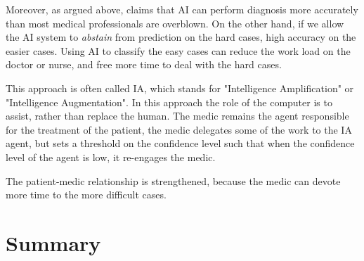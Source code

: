 \documentclass[10pt]{wlscirep}
\begin{document}
Moreover, as argued above, claims that AI can perform diagnosis more accurately than most medical professionals are overblown. On the other hand, if we allow the AI system to {\em abstain} from prediction on the hard cases, high accuracy on the easier cases. Using AI to classify the easy cases can reduce the work load on the doctor or nurse, and free more time to deal with the hard cases.

This approach is often called IA, which stands for "Intelligence Amplification" or "Intelligence Augmentation". In this approach the role of the computer is to assist, rather than replace the human.  The medic remains the agent responsible for the treatment of the patient, the medic delegates some of the work to the IA agent, but sets a threshold on the confidence level such that when the confidence level of the agent is low, it re-engages the medic.

The patient-medic relationship is strengthened, because the medic can devote more time to the more difficult cases.

\section{Summary}

 


\end{document}
